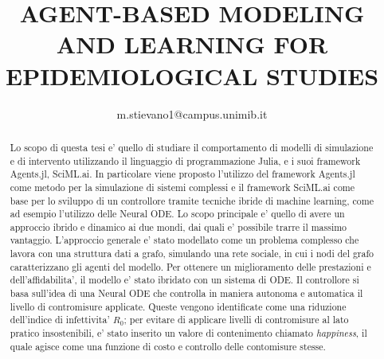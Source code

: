 \documentclass{article}
\title{AGENT-BASED MODELING AND LEARNING FOR EPIDEMIOLOGICAL STUDIES}
\author{m.stievano1@campus.unimib.it}
\begin{document}


\begin{abstract}
    Lo scopo di questa tesi e' quello di studiare il comportamento di modelli di simulazione
    e di intervento utilizzando il linguaggio di programmazione Julia, e i suoi framework
    Agents.jl, SciML.ai. In particolare viene proposto l'utilizzo del framework Agents.jl come 
    metodo per la simulazione di sistemi complessi e il framework SciML.ai come base per 
    lo sviluppo di un controllore tramite tecniche ibride di machine learning, come ad esempio 
    l'utilizzo delle Neural ODE. Lo scopo principale e' quello di avere un approccio ibrido e dinamico 
    ai due mondi, dai quali e' possibile trarre il massimo vantaggio. L'approccio generale 
    e' stato modellato come un problema complesso che lavora con una struttura dati a grafo, simulando
    una rete sociale, in cui i nodi del grafo caratterizzano gli agenti del modello. Per ottenere un 
    miglioramento delle prestazioni e dell'affidabilita', il modello e' stato ibridato con 
    un sistema di ODE. Il controllore si basa sull'idea di una Neural ODE che controlla 
    in maniera autonoma e automatica il livello di contromisure applicate. Queste vengono 
    identificate come una riduzione dell'indice di infettivita' $R_0$; per evitare di applicare 
    livelli di contromisure al lato pratico insostenibili, e' stato inserito un valore di contenimento 
    chiamato \emph{happiness}, il quale agisce come una funzione di costo e controllo delle contomisure stesse.
\end{abstract}



\tableofcontents
\newpage
\listoffigures
\newpage














% 
% 

\nocite{*}

% 
% 



\appendix

\end{document}
